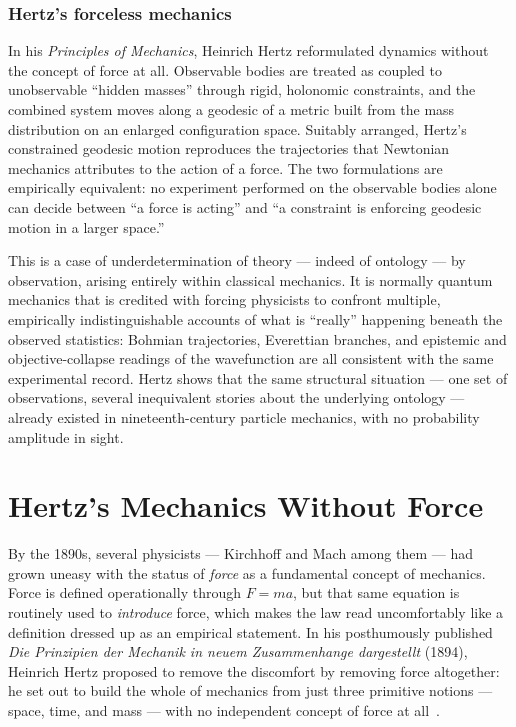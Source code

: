 \subsection{Hertz's forceless mechanics }

In his \emph{Principles of Mechanics}, Heinrich Hertz reformulated dynamics
without the concept of force at all. Observable bodies are treated as coupled to
unobservable ``hidden masses'' through rigid, holonomic constraints, and the
combined system moves along a geodesic of a metric built from the mass
distribution on an enlarged configuration space. Suitably arranged, Hertz's
constrained geodesic motion reproduces the trajectories that Newtonian mechanics
attributes to the action of a force. The two formulations are empirically
equivalent: no experiment performed on the observable bodies alone can decide
between ``a force is acting'' and ``a constraint is enforcing geodesic motion in
a larger space.''

This is a case of underdetermination of theory --- indeed of ontology --- by
observation, arising entirely within classical mechanics. It is normally quantum
mechanics that is credited with forcing physicists to confront multiple,
empirically indistinguishable accounts of what is ``really'' happening beneath
the observed statistics: Bohmian trajectories, Everettian branches, and
epistemic and objective-collapse readings of the wavefunction are all consistent
with the same experimental record. Hertz shows that the same structural
situation --- one set of observations, several inequivalent stories about the
underlying ontology --- already existed in nineteenth-century particle mechanics,
with no probability amplitude in sight.


\chapter{Hertz's Mechanics Without Force}
\label{hm}

By the 1890s, several physicists --- Kirchhoff and Mach among them
--- had grown uneasy with the status of \emph{force} as a
fundamental concept of mechanics. Force is defined operationally
through $F=ma$, but that same equation is routinely used to
\emph{introduce} force, which makes the law read uncomfortably like
a definition dressed up as an empirical statement. In his
posthumously published \emph{Die Prinzipien der Mechanik in neuem
Zusammenhange dargestellt} (1894), Heinrich Hertz proposed to remove
the discomfort by removing force altogether: he set out to build the
whole of mechanics from just three primitive notions --- space,
time, and mass --- with no independent concept of force at
all~\cite{hertz}.

